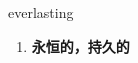 
\begin{frame}
{\huge everlasting}
\begin{center}
\begin{enumerate}\Large
  \item \textbf{永恒的，持久的}
\end{enumerate}
\end{center}
\end{frame}
